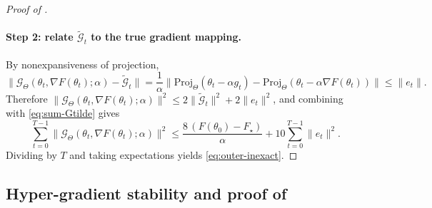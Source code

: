 \documentclass{article}
\theoremstyle{normaltheorem}
\begin{document}
\begin{proof}[Proof of ]
\paragraph{Step 2: relate $\widetilde{\mathcal G}_t$ to the true gradient mapping.}
By nonexpansiveness of projection,
\[
\|\mathcal G_{\Theta}(\theta_t,\nabla F(\theta_t);\alpha)-\widetilde{\mathcal G}_t\|
=
\frac{1}{\alpha}\big\|\mathrm{Proj}_{\Theta}(\theta_t-\alpha g_t)-\mathrm{Proj}_{\Theta}(\theta_t-\alpha\nabla F(\theta_t))\big\|
\le \|e_t\|.
\]
Therefore $\|\mathcal G_{\Theta}(\theta_t,\nabla F(\theta_t);\alpha)\|^2\le 2\|\widetilde{\mathcal G}_t\|^2+2\|e_t\|^2$,
and combining with \eqref{eq:sum-Gtilde} gives
\[
\sum_{t=0}^{T-1}\|\mathcal G_{\Theta}(\theta_t,\nabla F(\theta_t);\alpha)\|^2
\le
\frac{8\,(F(\theta_0)-F_\star)}{\alpha}
+10\sum_{t=0}^{T-1}\|e_t\|^2.
\]
Dividing by $T$ and taking expectations yields \eqref{eq:outer-inexact}.
\end{proof}


\subsection[Hyper-gradient stability]{Hyper-gradient stability and proof of }\label{append:hg-stability}
\end{document}
